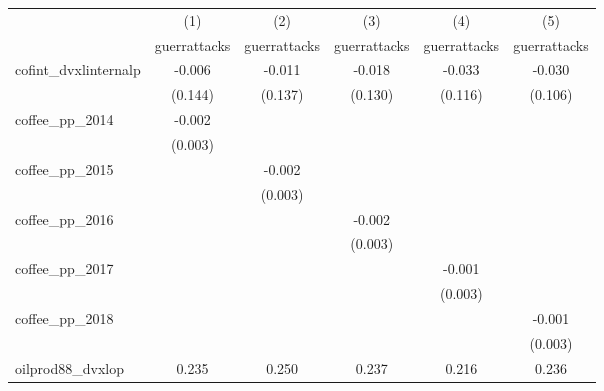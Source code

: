 {
\def\sym#1{\ifmmode^{#1}\else\(^{#1}\)\fi}
\begin{tabular}{l*{5}{c}}
\hline\hline
            &\multicolumn{1}{c}{(1)}&\multicolumn{1}{c}{(2)}&\multicolumn{1}{c}{(3)}&\multicolumn{1}{c}{(4)}&\multicolumn{1}{c}{(5)}\\
            &\multicolumn{1}{c}{guerrattacks}&\multicolumn{1}{c}{guerrattacks}&\multicolumn{1}{c}{guerrattacks}&\multicolumn{1}{c}{guerrattacks}&\multicolumn{1}{c}{guerrattacks}\\
\hline
cofint\_dvxlinternalp&      -0.006         &      -0.011         &      -0.018         &      -0.033         &      -0.030         \\
            &     (0.144)         &     (0.137)         &     (0.130)         &     (0.116)         &     (0.106)         \\
[1em]
coffee\_pp\_2014&      -0.002         &                     &                     &                     &                     \\
            &     (0.003)         &                     &                     &                     &                     \\
[1em]
coffee\_pp\_2015&                     &      -0.002         &                     &                     &                     \\
            &                     &     (0.003)         &                     &                     &                     \\
[1em]
coffee\_pp\_2016&                     &                     &      -0.002         &                     &                     \\
            &                     &                     &     (0.003)         &                     &                     \\
[1em]
coffee\_pp\_2017&                     &                     &                     &      -0.001         &                     \\
            &                     &                     &                     &     (0.003)         &                     \\
[1em]
coffee\_pp\_2018&                     &                     &                     &                     &      -0.001         \\
            &                     &                     &                     &                     &     (0.003)         \\
[1em]
oilprod88\_dvxlop&       0.235         &       0.250         &       0.237         &       0.216         &       0.236         \\

\end{tabular}}
